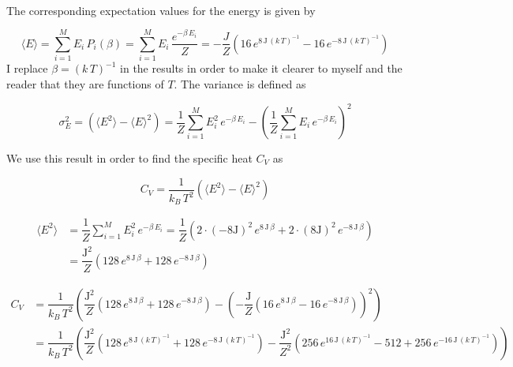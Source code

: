 \documentclass[a4paper, fontsize=11pt]{article}
\begin{document}
\paragraph{}
The corresponding expectation values for the energy is given by

\begin{equation}
\langle E \rangle = \sum^M_{i=1} E_{i} \, P_{i}(\beta) = \sum^M_{i=1} E_{i} \, \dfrac{e^{-\beta \, E_{i}}}{Z} = -\dfrac{J}{Z} \left(16\, e^{8 \, \text{J} \, (k \, T)^{-1}} - 16 \, e^{-8 \, \text{J} \, (k \, T)^{-1}} \right)
\end{equation} 
I replace $\beta = (k \, T)^{-1}$ in the results in order to make it clearer to myself and the reader that they are functions of $T$. The variance is defined as

\begin{equation}
\sigma^2_{E} = \left( \langle E^2 \rangle - \langle E \rangle^2 \right) = \dfrac{1}{Z} \sum^M_{i=1} E_{i}^2 \, e^{-\beta \, E_{i}} - \left( \dfrac{1}{Z} \sum^M_{i=1} E_{i} \, e^{-\beta \, E_{i}} \right)^2
\end{equation}

We use this result in order to find the specific heat  $C_{V}$ as

\begin{equation}
C_{V} = \dfrac{1}{k_{B} \, T^2} \left( \langle E^2 \rangle - \langle E \rangle^2 \right)
\end{equation}

\begin{align}
\langle E^2 \rangle &= \dfrac{1}{Z} \sum^M_{i=1} E_{i}^2 \, e^{-\beta \, E_{i}} = \dfrac{1}{Z} \left( 2 \cdot \left( -8 \text{J} \right)^2 \, e^{8 \, \text{J} \, \beta} + 2 \cdot \left( 8 \text{J} \right)^2 \, e^{-8 \, \text{J} \, \beta} \right)
\\
&= \dfrac{\text{J}^2}{Z} \left( 128 \, e^{8 \, \text{J} \, \beta} + 128 \, e^{-8 \, \text{J} \, \beta} \right)
\end{align}


\begin{align}
C_{V} &= \dfrac{1}{k_{B} \, T^2} \left( \dfrac{\text{J}^2}{Z} \left( 128 \, e^{8 \, \text{J} \, \beta} + 128 \, e^{-8 \, \text{J} \, \beta} \right) - \left(-\dfrac{\text{J}}{Z} \left(16 \, e^{8 \, \text{J} \, \beta} - 16 \, e^{-8 \, \text{J} \, \beta} \right) \right)^2 \right)
\\
&= 
\dfrac{1}{k_{B} \, T^2} \left( \dfrac{\text{J}^2}{Z} \left( 128 \, e^{8 \, \text{J} \, (k \, T)^{-1}} + 128 \, e^{-8 \, \text{J} \, (k \, T)^{-1}} \right) 
- 
\dfrac{\text{J}^2}{Z^2} \left(256 \, e^{16 \, \text{J} \, (k \, T)^{-1}} - 512 + 256 \, e^{-16 \, \text{J} \, (k \, T)^{-1}} \right) \right) 
\end{align}
\end{document}
